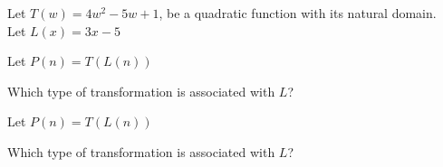 \documentclass{ximera}
\author{Lee Wayand}
\begin{document}
\begin{exercise}




Let $T(w) = 4 w^2 - 5 w + 1$, be a quadratic function with its natural domain. \\

Let $L(x) = 3 x - 5$


\begin{question}


Let $P(n) = T(L(n))$


Which type of transformation is associated with $L$?


\begin{multipleChoice}
\end{multipleChoice}


\end{question}







\begin{question}


Let $P(n) = T(L(n))$


Which type of transformation is associated with $L$?


\begin{multipleChoice}
\end{multipleChoice}


\end{question}






\end{exercise}
\end{document}
